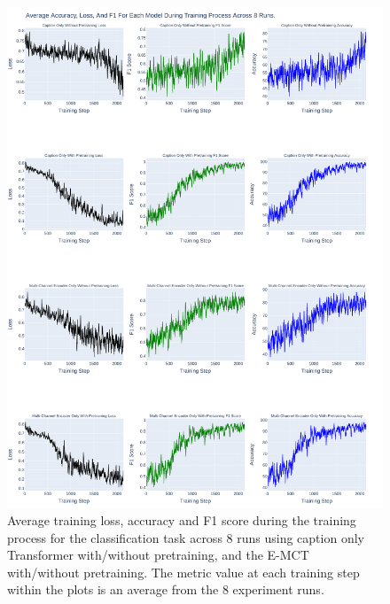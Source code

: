 \begin{figure}[p]
    \centering
    \includegraphics[width=\maxwidth{\textwidth}]{src/images/Loss-Distriubiton-Train-Set-1.pdf}
    \caption{Average training loss, accuracy and F1 score during the training process for the classification task across 8 runs using caption only Transformer with/without pretraining, and the E-MCT with/without pretraining. The metric value at each training step within the plots is an average from the 8 experiment runs.}
    \label{figure\arabic{figurecounter}}
\end{figure}

